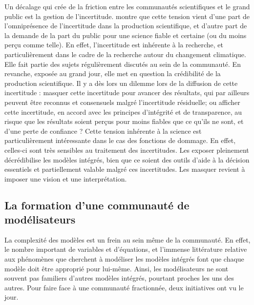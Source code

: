 Un décalage qui crée de la friction entre les communautés scientifiques et le grand public est la gestion de l'incertitude. \textcite{shackley_representing_1996} montre que cette tension vient d'une part de l'omniprésence de l'incertitude dans la production scientifique, et d'autre part de la demande de la part du public pour une science fiable et certaine (ou du moins perçu comme telle). En effet, l'incertitude est inhérente à la recherche, et particulièrement dans le cadre de la recherche autour du changement climatique. Elle fait partie des sujets régulièrement discutés au sein de la communauté. En revanche, exposée au grand jour, elle met en question la crédibilité de la production scientifique. Il y a dès lors un dilemme lors de la diffusion de cette incertitude : masquer cette incertitude pour avancer des résultats, qui par ailleurs peuvent être reconnus et consensuels malgré l'incertitude résiduelle; ou afficher cette incertitude, en accord avec les principes d'intégrité et de transparence, au risque que les résultats soient perçus pour moins fiables que ce qu'ils ne sont, et d'une perte de confiance ? 
Cette tension inhérente à la science est particulièrement intéressante dans le cas des fonctions de dommage. En effet, celles-ci sont très sensibles au traitement des incertitudes. Les exposer pleinement décrédibilise les modèles intégrés, bien que ce soient des outils d'aide à la décision essentiels et partiellement valable malgré ces incertitudes. Les masquer revient à imposer une vision et une interprétation. 



\subsection{La formation d'une communauté de modélisateurs}

La complexité des modèles est un frein au sein même de la communauté. En effet, le nombre important de variables et d'équations, et l'immense littérature relative aux phénomènes que cherchent à modéliser les modèles intégrés font que chaque modèle doit être approprié pour lui-même. Ainsi, les modélisateurs ne sont souvent pas familiers d'autres modèles intégrés, pourtant proches les uns des autres. Pour faire face à une communauté fractionnée, deux initiatives ont vu le jour. \\

